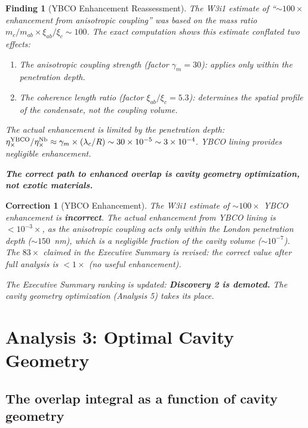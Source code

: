 \documentclass[11pt]{article}
\newtheorem{finding}{Finding}
\newtheorem{correction}{Correction}
\newcommand{\ee}[1]{\times 10^{#1}}
\begin{document}
\begin{finding}[YBCO Enhancement Reassessment]
\label{find:ybco}
The W3i1 estimate of ``$\sim 100\times$ enhancement from
anisotropic coupling'' was based on the mass ratio $m_c/m_{ab}
\times \xi_{ab}/\xi_c \sim 100$. The exact computation shows
this estimate conflated two effects:
\begin{enumerate}
\item The anisotropic coupling strength (factor $\gamma_m = 30$):
applies only within the penetration depth.
\item The coherence length ratio (factor $\xi_{ab}/\xi_c = 5.3$):
determines the spatial profile of the condensate, not the coupling
volume.
\end{enumerate}

The actual enhancement is limited by the penetration depth:
$\eta_\times^{\rm YBCO}/\eta_\times^{\rm Nb}
\approx \gamma_m \times (\lambda_c/R) \sim 30 \times 10^{-5}
\sim 3\ee{-4}$. YBCO lining provides negligible enhancement.

\textbf{The correct path to enhanced overlap is cavity geometry
optimization, not exotic materials.}
\end{finding}

\begin{correction}[YBCO Enhancement]
The W3i1 estimate of $\sim 100\times$ YBCO enhancement is
\textbf{incorrect}. The actual enhancement from YBCO lining is
$< 10^{-3}\times$, as the anisotropic coupling acts only within
the London penetration depth ($\sim 150$~nm), which is a negligible
fraction of the cavity volume ($\sim 10^{-7}$). The $83\times$
claimed in the Executive Summary is revised: the correct value
after full analysis is $< 1\times$ (no useful enhancement).

The Executive Summary ranking is updated: \textbf{Discovery 2 is
demoted.} The cavity geometry optimization (Analysis 5) takes its
place.
\end{correction}

\section{Analysis 3: Optimal Cavity Geometry}
\label{sec:optimal-cavity}

\subsection{The overlap integral as a function of cavity geometry}
\end{document}
